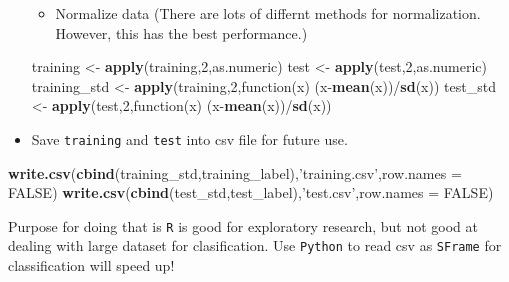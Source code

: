 \documentclass[]{article}
\newenvironment{Shaded}{\begin{snugshade}}{\end{snugshade}}
\newcommand{\KeywordTok}[1]{\textcolor[rgb]{0.13,0.29,0.53}{\textbf{{#1}}}}
\newcommand{\DataTypeTok}[1]{\textcolor[rgb]{0.13,0.29,0.53}{{#1}}}
\newcommand{\DecValTok}[1]{\textcolor[rgb]{0.00,0.00,0.81}{{#1}}}
\newcommand{\StringTok}[1]{\textcolor[rgb]{0.31,0.60,0.02}{{#1}}}
\newcommand{\OtherTok}[1]{\textcolor[rgb]{0.56,0.35,0.01}{{#1}}}
\newcommand{\NormalTok}[1]{{#1}}
\begin{document}
\begin{itemize}
  \begin{itemize}
  \itemsep1pt\parskip0pt
  \item
    Normalize data (There are lots of differnt methods for
    normalization. However, this has the best performance.)
  \end{itemize}

\begin{Shaded}
\begin{Highlighting}[]
\NormalTok{training <-}\StringTok{ }\KeywordTok{apply}\NormalTok{(training,}\DecValTok{2}\NormalTok{,as.numeric)}
\NormalTok{test <-}\StringTok{ }\KeywordTok{apply}\NormalTok{(test,}\DecValTok{2}\NormalTok{,as.numeric)}
\NormalTok{training_std <-}\StringTok{ }\KeywordTok{apply}\NormalTok{(training,}\DecValTok{2}\NormalTok{,function(x) (x-}\KeywordTok{mean}\NormalTok{(x))/}\KeywordTok{sd}\NormalTok{(x))}
\NormalTok{test_std <-}\StringTok{ }\KeywordTok{apply}\NormalTok{(test,}\DecValTok{2}\NormalTok{,function(x) (x-}\KeywordTok{mean}\NormalTok{(x))/}\KeywordTok{sd}\NormalTok{(x))}
\end{Highlighting}
\end{Shaded}
\item
  Save \texttt{training} and \texttt{test} into csv file for future use.
\end{itemize}

\begin{Shaded}
\begin{Highlighting}[]
\KeywordTok{write.csv}\NormalTok{(}\KeywordTok{cbind}\NormalTok{(training_std,training_label),}\StringTok{'training.csv'}\NormalTok{,}\DataTypeTok{row.names =} \OtherTok{FALSE}\NormalTok{)}
\KeywordTok{write.csv}\NormalTok{(}\KeywordTok{cbind}\NormalTok{(test_std,test_label),}\StringTok{'test.csv'}\NormalTok{,}\DataTypeTok{row.names =} \OtherTok{FALSE}\NormalTok{)}
\end{Highlighting}
\end{Shaded}

Purpose for doing that is \texttt{R} is good for exploratory research,
but not good at dealing with large dataset for clasification. Use
\texttt{Python} to read csv as \texttt{SFrame} for classification will
speed up!
\end{document}
